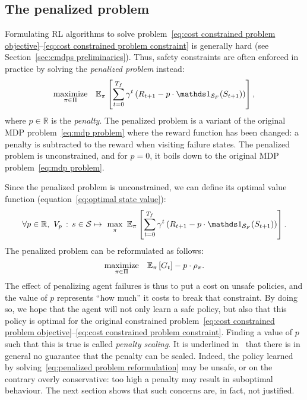 \subsection{The penalized problem}
Formulating RL algorithms to solve problem~\eqref{eq:cost constrained problem objective}--\eqref{eq:cost constrained problem constraint} is generally hard (see Section~\ref{sec:cmdps preliminaries}). Thus, safety constraints are often enforced in practice by solving the\emph{ penalized problem} instead:
\begin{equation}
	\underset{\pi\in\Pi}{\text{maximize}} \quad\expected_\pi\left[\sum_{t=0}^\Tf\gamma^t\left(R_{t+1} - p\cdot\indicator_\SF(S_{t+1})\right)\right], \label{eq:penalized problem}
\end{equation}
where $p\in\mathbb{R}$ is the\emph{ penalty}. The penalized problem is a variant of the original MDP problem~\eqref{eq:mdp problem} where the reward function has been changed: a penalty is subtracted to the reward when visiting failure states. The penalized problem is unconstrained, and for $p=0$, it boils down to the original MDP problem~\eqref{eq:mdp problem}. \par
Since the penalized problem is unconstrained, we can define its optimal value function (equation~\eqref{eq:optimal state value}):
\begin{equation}
	\forall p\in\mathbb{R},~V_p\,:\,s\in\S\mapsto~\max_\pi~\expected_\pi\left[\sum_{t=0}^\Tf\gamma^t\left(R_{t+1} - p\cdot\indicator_\SF(S_{t+1})\right)\right]. \label{eq:penalized value}
\end{equation}
The penalized problem can be reformulated as follows:
\begin{equation}
\underset{\pi\in\Pi}{\text{maximize}} \quad\mathbb{E}_\pi\left[G_t\right] - p\cdot\rho_\pi. \label{eq:penalized problem reformulation}
\end{equation}
The effect of penalizing agent failures is thus to put a cost on unsafe policies, and the value of $p$ represents \enquote{how much} it costs to break that constraint. By doing so, we hope that the agent will not only learn a safe policy, but also that this policy is optimal for the original constrained problem~\eqref{eq:cost constrained problem objective}--\eqref{eq:cost constrained problem constraint}. Finding a value of $p$ such that this is true is called\emph{ penalty scaling}. It is underlined in~\cite{garcia2015comprehensive} that there is in general no guarantee that the penalty can be scaled. Indeed, the policy learned by solving~\eqref{eq:penalized problem reformulation} may be unsafe, or on the contrary overly conservative: too high a penalty may result in suboptimal behaviour. The next section shows that such concerns are, in fact, not justified.

